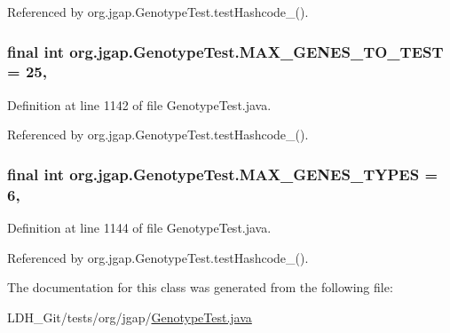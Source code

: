 Referenced by org.\-jgap.\-Genotype\-Test.\-test\-Hashcode\-\_().

\hypertarget{classorg_1_1jgap_1_1_genotype_test_a02545f85bc036a2b6371683494e169d2}{
\subsubsection[{M\-A\-X\-\_\-\-G\-E\-N\-E\-S\-\_\-\-T\-O\-\_\-\-T\-E\-S\-T}]{\setlength{\rightskip}{0pt plus 5cm}final int org.\-jgap.\-Genotype\-Test.\-M\-A\-X\-\_\-\-G\-E\-N\-E\-S\-\_\-\-T\-O\-\_\-\-T\-E\-S\-T = 25\hspace{0.3cm}{\ttfamily [static]}, {\ttfamily [private]}}}\label{classorg_1_1jgap_1_1_genotype_test_a02545f85bc036a2b6371683494e169d2}


Definition at line 1142 of file Genotype\-Test.\-java.



Referenced by org.\-jgap.\-Genotype\-Test.\-test\-Hashcode\-\_().

\hypertarget{classorg_1_1jgap_1_1_genotype_test_a9c8188a54218fb27dbfb06a3b9ade842}{
\subsubsection[{M\-A\-X\-\_\-\-G\-E\-N\-E\-S\-\_\-\-T\-Y\-P\-E\-S}]{\setlength{\rightskip}{0pt plus 5cm}final int org.\-jgap.\-Genotype\-Test.\-M\-A\-X\-\_\-\-G\-E\-N\-E\-S\-\_\-\-T\-Y\-P\-E\-S = 6\hspace{0.3cm}{\ttfamily [static]}, {\ttfamily [private]}}}\label{classorg_1_1jgap_1_1_genotype_test_a9c8188a54218fb27dbfb06a3b9ade842}


Definition at line 1144 of file Genotype\-Test.\-java.



Referenced by org.\-jgap.\-Genotype\-Test.\-test\-Hashcode\-\_().



The documentation for this class was generated from the following file\-:\begin{DoxyCompactItemize}
\item 
L\-D\-H\-\_\-\-Git/tests/org/jgap/\hyperlink{_genotype_test_8java}{Genotype\-Test.\-java}\end{DoxyCompactItemize}
